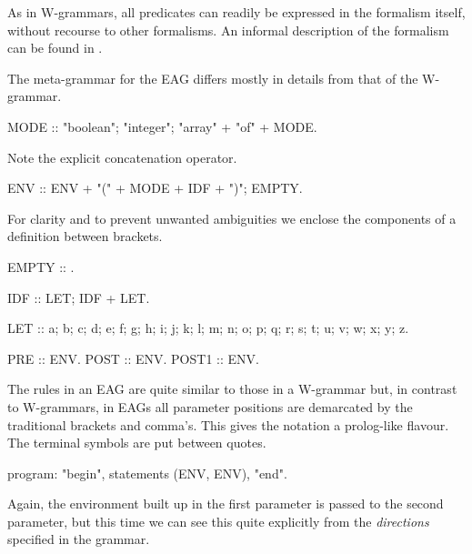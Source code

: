 As in W-grammars, all predicates can readily be expressed in the
formalism itself, without recourse to other formalisms.
An informal description of the formalism can be found in \cite{meijer:eagproj}.

The meta-grammar for the EAG differs mostly in details from
that of the W-grammar.
\begin{elan}
MODE :: "boolean"; "integer"; "array" + "of" + MODE.
\end{elan}
Note the explicit concatenation operator.
\begin{elan}
ENV :: ENV + "(" + MODE + IDF + ")"; EMPTY.
\end{elan}
For clarity and to prevent unwanted ambiguities we enclose the components
of a definition between brackets.
\begin{elan}
EMPTY :: .
\end{elan}
\begin{elan}
IDF :: LET; IDF + LET.
\end{elan}
\begin{elan}
LET :: a; b; c; d; e; f; g; h; i; j; k; l; m; n; o; p; q;
          r; s; t; u; v; w; x; y; z.
\end{elan}
\begin{elan}
PRE :: ENV.    POST :: ENV.    POST1 :: ENV.
\end{elan}
The rules in an EAG are quite similar to those in a W-grammar but,
in contrast to W-grammars, in EAGs all
parameter positions are demarcated by the traditional brackets and
comma's. This gives the notation a {\sc prolog}-like flavour. The terminal
symbols are put between quotes.
\begin{elan}
program:
   "begin", statements (ENV, ENV), "end".
\end{elan}
Again, the environment built up in the first parameter is passed to
the second parameter, but this time we can see this quite explicitly
from the {\em directions} specified in the grammar.

